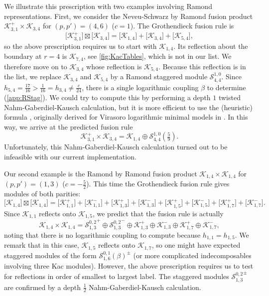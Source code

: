 \documentclass[a4paper,reqno,12pt]{report}
\theoremstyle{definition}
\numberwithin{equation}{section}
\newcommand{\Kac}[1]{\mathcal{K}_{#1}}       %
\newcommand{\Stag}[2]{\mathcal{S}_{#1}^{#2}} %
\newcommand{\Gr}[1]{\bigl[ #1 \bigr]}            %
\newcommand{\fuse}{\mathbin{\times}}                                            %
\newcommand{\Grfuse}{\mathbin{\boxtimes}}                                       %
\newcommand{\NGK}{Nahm-Gaberdiel-Kausch}
\newcommand{\ns}{Neveu-Schwarz}
\newcommand{\ram}{Ramond}
\theoremstyle{plain}
\begin{document}
We illustrate this prescription with two examples involving \ram{} representations.  First, we consider the \ns{} by Ramond fusion product $\Kac{3,1}^+ \fuse \Kac{3,4}$ for $(p,p') = (4,6)$ ($c=1$).  The Grothendieck fusion rule is
\begin{equation}
\Gr{\Kac{3,1}^+} \Grfuse \Gr{\Kac{3,4}} = \Gr{\Kac{1,4}} + \Gr{\Kac{3,4}} + \Gr{\Kac{5,4}},
\end{equation}
so the above prescription requires us to start with $\Kac{1,4}$.  Its reflection about the boundary at $r=4$ is $\Kac{7,4}$, see \cref{fig:KacTables}, which is not in our list.  We therefore move on to $\Kac{3,4}$ whose reflection is $\Kac{5,4}$.  Because this reflection is in the list, we replace $\Kac{3,4}$ and $\Kac{5,4}$ by a Ramond staggered module $\Stag{4,4}{1,0}$.  Since $h_{5,4} = \frac{17}{16} > \frac{1}{16} = h_{3,4} \neq \frac{c}{24}$, there is a single logarithmic coupling $\beta$ to determine (\cref{app:RStag}).  We could try to compute this by performing a depth $1$ twisted \NGK{} calculation, but it is more efficient to use the (heuristic) formula \cite[Eq.~(B.5)]{CanFusI15}, originally derived for Virasoro logarithmic minimal models in \cite{VasInd11,GaiLat13}.  In this way, we arrive at the predicted fusion rule
\begin{equation}
\Kac{3,1}^+ \fuse \Kac{3,4} = \Kac{1,4} \oplus \Stag{4,4}{1,0}(\tfrac{5}{9}).
\end{equation}
Unfortunately, this \NGK{} calculation turned out to be infeasible with our current implementation.

Our second example is the Ramond by Ramond fusion product $\Kac{1,4} \fuse \Kac{1,4}$ for $(p,p') = (1,3)$ ($c=-\frac{5}{2}$).  This time the Grothendieck fusion rule gives modules of both parities:
\begin{equation}
\Gr{\Kac{1,4}} \Grfuse \Gr{\Kac{1,4}} = \Gr{\Kac{1,1}^+} + \Gr{\Kac{1,1}^-} + \Gr{\Kac{1,3}^+} + \Gr{\Kac{1,3}^-} + \Gr{\Kac{1,5}^+} + \Gr{\Kac{1,5}^-} + \Gr{\Kac{1,7}^+} + \Gr{\Kac{1,7}^-}.
\end{equation}
Since $\Kac{1,1}$ reflects onto $\Kac{1,5}$, we predict that the fusion rule is actually
\begin{equation}
\Kac{1,4} \fuse \Kac{1,4} = {\Stag{1,3}{0,2}}^+ \oplus {\Stag{1,3}{0,2}}^- \oplus \Kac{1,3}^+ \oplus \Kac{1,3}^- \oplus \Kac{1,7}^+ \oplus \Kac{1,7}^-,
\end{equation}
noting that there is no logarithmic coupling to compute because $h_{1,1} = h_{1,5}$.  We remark that in this case, $\Kac{1,5}$ reflects onto $\Kac{1,7}$, so one might have expected staggered modules of the form $\Stag{1,6}{0,1}(\beta)^{\pm}$ (or more complicated indecomposables involving three Kac modules).  However, the above prescription requires us to test for reflections in order of smallest to largest label.  The staggered modules ${\Stag{1,3}{0,2}}^{\pm}$ are confirmed by a depth $\frac{1}{2}$ \NGK{} calculation.
\end{document}
